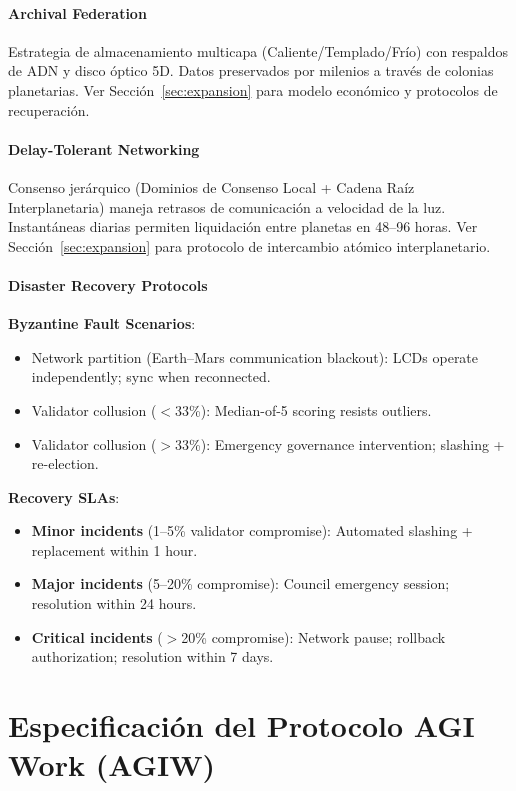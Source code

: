 \documentclass[11pt]{article}
\begin{document}
\paragraph{Archival Federation}
Estrategia de almacenamiento multicapa (Caliente/Templado/Frío) con respaldos de ADN y disco óptico 5D. Datos preservados por milenios a través de colonias planetarias. Ver Sección~\ref{sec:expansion} para modelo económico y protocolos de recuperación.

\paragraph{Delay-Tolerant Networking}
Consenso jerárquico (Dominios de Consenso Local + Cadena Raíz Interplanetaria) maneja retrasos de comunicación a velocidad de la luz. Instantáneas diarias permiten liquidación entre planetas en 48--96 horas. Ver Sección~\ref{sec:expansion} para protocolo de intercambio atómico interplanetario.

\paragraph{Disaster Recovery Protocols}
\textbf{Byzantine Fault Scenarios}:
\begin{itemize}[noitemsep]
  \item Network partition (Earth--Mars communication blackout): LCDs operate independently; sync when reconnected.
  \item Validator collusion ($<$33\%): Median-of-5 scoring resists outliers.
  \item Validator collusion ($>$33\%): Emergency governance intervention; slashing + re-election.
\end{itemize}

\textbf{Recovery SLAs}:
\begin{itemize}[noitemsep]
  \item \textbf{Minor incidents} (1--5\% validator compromise): Automated slashing + replacement within 1 hour.
  \item \textbf{Major incidents} (5--20\% compromise): Council emergency session; resolution within 24 hours.
  \item \textbf{Critical incidents} ($>$20\% compromise): Network pause; rollback authorization; resolution within 7 days.
\end{itemize}

\section{Especificación del Protocolo AGI Work (AGIW)}
\label{sec:agiw-spec}
\end{document}
